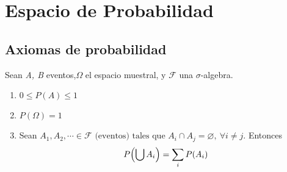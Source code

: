 \chapter{Espacio de Probabilidad}



\section{Axiomas de probabilidad}

Sean \textit{A, B} eventos,$\Omega$ el espacio muestral, y $\mathcal F$ una $\sigma$-algebra.

\begin{enumerate}
  \item $0 \le P(A) \le 1$
  \item $P(\Omega) = 1$
  \item Sean $A_1, A_2, \cdots \in \mathcal F \text{ (eventos) tales que } A_i \cap A_j = \varnothing, ~\forall i \neq j.$ Entonces $$P\parens*{\bigcup A_i} = \sum_i P(A_i)$$
\end{enumerate}

